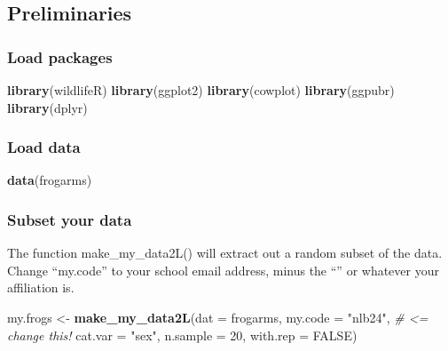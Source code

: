 \documentclass[]{book}
\newenvironment{Shaded}{\begin{snugshade}}{\end{snugshade}}
\newcommand{\KeywordTok}[1]{\textcolor[rgb]{0.13,0.29,0.53}{\textbf{#1}}}
\newcommand{\DataTypeTok}[1]{\textcolor[rgb]{0.13,0.29,0.53}{#1}}
\newcommand{\DecValTok}[1]{\textcolor[rgb]{0.00,0.00,0.81}{#1}}
\newcommand{\StringTok}[1]{\textcolor[rgb]{0.31,0.60,0.02}{#1}}
\newcommand{\CommentTok}[1]{\textcolor[rgb]{0.56,0.35,0.01}{\textit{#1}}}
\newcommand{\OtherTok}[1]{\textcolor[rgb]{0.56,0.35,0.01}{#1}}
\newcommand{\NormalTok}[1]{#1}
\theoremstyle{definition}
\theoremstyle{definition}
\theoremstyle{definition}
\theoremstyle{remark}
\begin{document}
\subsection{Preliminaries}\label{preliminaries-4}

\subsubsection{Load packages}\label{load-packages-3}

\begin{Shaded}
\begin{Highlighting}[]
\KeywordTok{library}\NormalTok{(wildlifeR)}
\KeywordTok{library}\NormalTok{(ggplot2)}
\KeywordTok{library}\NormalTok{(cowplot)}
\KeywordTok{library}\NormalTok{(ggpubr)}
\KeywordTok{library}\NormalTok{(dplyr)}
\end{Highlighting}
\end{Shaded}

\subsubsection{Load data}\label{load-data-3}

\begin{Shaded}
\begin{Highlighting}[]
\KeywordTok{data}\NormalTok{(frogarms)}
\end{Highlighting}
\end{Shaded}

\subsubsection{Subset your data}\label{subset-your-data-3}

The function make\_my\_data2L() will extract out a random subset of the
data. Change ``my.code'' to your school email address, minus the
``\citet{pitt.edu}'' or whatever your affiliation is.

\begin{Shaded}
\begin{Highlighting}[]
\NormalTok{my.frogs <-}\StringTok{ }\KeywordTok{make_my_data2L}\NormalTok{(}\DataTypeTok{dat =}\NormalTok{ frogarms, }
                           \DataTypeTok{my.code =} \StringTok{"nlb24"}\NormalTok{, }\CommentTok{# <=  change this!}
                           \DataTypeTok{cat.var =} \StringTok{"sex"}\NormalTok{,}
                           \DataTypeTok{n.sample =} \DecValTok{20}\NormalTok{, }
                           \DataTypeTok{with.rep =} \OtherTok{FALSE}\NormalTok{)}
\end{Highlighting}
\end{Shaded}
\end{document}
